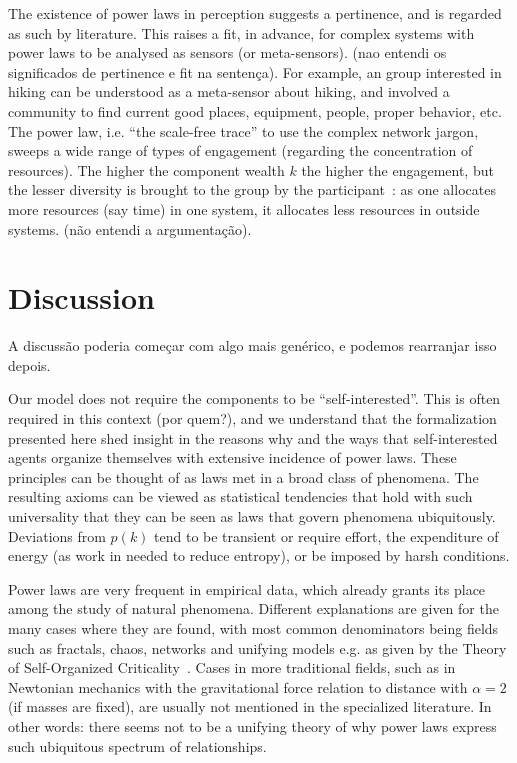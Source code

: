 \documentclass[a4paper, 11pt]{article} %
\begin{document}
The existence of power laws in perception
suggests a pertinence, and is regarded as such by literature.
This raises a fit, in advance, for complex systems with power laws
to be analysed as sensors (or meta-sensors). (nao entendi os significados de pertinence e fit na sentença). For example, an group interested in  hiking can be understood as a meta-sensor about hiking, and involved a community to find current good places, equipment, people, proper behavior, etc. The power law, i.e. ``the scale-free trace'' to use
the complex network jargon, sweeps a wide
range of types of engagement (regarding the concentration of resources).
The higher the component wealth $k$ the higher the engagement,
but the lesser diversity is brought to the group
by the participant~\cite{tStable}: 
as one allocates more resources (say time)
in one system,
it allocates less resources in outside systems. (não entendi a argumentação).


\section{Discussion}

A discussão poderia começar com algo mais genérico, e podemos rearranjar isso depois.

Our model does not require the components to be ``self-interested''.
This is often required in this context (por quem?), and 
we understand that the formalization presented here shed insight
in the reasons why and the ways that self-interested agents
organize themselves with extensive incidence of power laws. These principles can be thought of as laws met in
a broad class of phenomena. The resulting axioms can be viewed as statistical tendencies that hold with such universality that they can be seen as laws that govern phenomena ubiquitously. Deviations from $p(k)$ tend to be transient or require effort, the expenditure of energy (as work in needed to reduce entropy), or be imposed by harsh conditions.

Power laws are very frequent in empirical data, which already grants its place among the study of natural phenomena.
Different explanations are given for the many cases where
they are found, with most common denominators being fields such as
fractals, chaos, networks and unifying models e.g. as given by the Theory of Self-Organized Criticality~\cite{part}. Cases in more traditional fields, such as in Newtonian mechanics with the gravitational force relation to distance with $\alpha=2$ (if masses are fixed), are usually not mentioned in the specialized literature. In other words: there seems not to be a unifying theory of why power laws express such ubiquitous spectrum of relationships.
\end{document}
